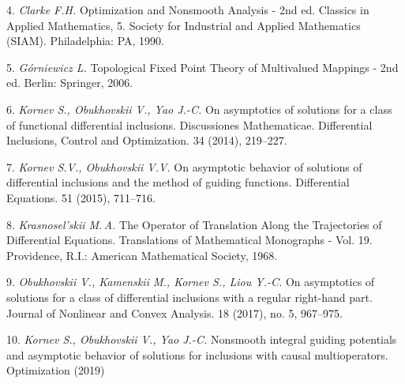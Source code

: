4. {\it Clarke F.H.} Optimization and Nonsmooth Analysis - 2nd ed. Classics in Applied Mathematics, 5. Society for Industrial and Applied Mathematics (SIAM). Philadelphia: PA, 1990.

5. {\it G\'orniewicz L.} Topological Fixed Point Theory of Multi\-valued Mappings - 2nd ed. Berlin: Springer, 2006.

6. {\it Kornev S., Obukhovskii V., Yao J.-C.} On asymptotics of solutions for a class of functional differential inclusions. Discus\-sio\-nes Mathematicae. Differential Inclusions, Control and Opti\-mi\-zation. 34 (2014), 219--227.

7. {\it Kornev S.V., Obukhovskii V.V.} On asymptotic behavior of solutions of differential inclusions and the method of guiding functions. Differential Equations. 51 (2015), 711--716.

8. {\it Krasnosel'skii M.\,A.} The Operator of Translation Along the Trajectories of Differential Equations. Translations of \linebreak Mathematical Monographs - Vol. 19. Providence, R.I.: American Ma\-the\-matical Society, 1968.

9. {\it Obukhovskii V., Kamenskii M., Kornev S., Liou Y.-C.} On asymptotics of solutions for a class of differential inclusions with a regular right-hand part. Journal of Nonlinear and Convex Analysis. 18 (2017), no. 5, 967--975.

10. {\it Kornev S., Obukhovskii V., Yao J.-C.} Nonsmooth integral guiding potentials and asymptotic behavior of solutions for inclusions with causal multioperators. Optimization (2019)
